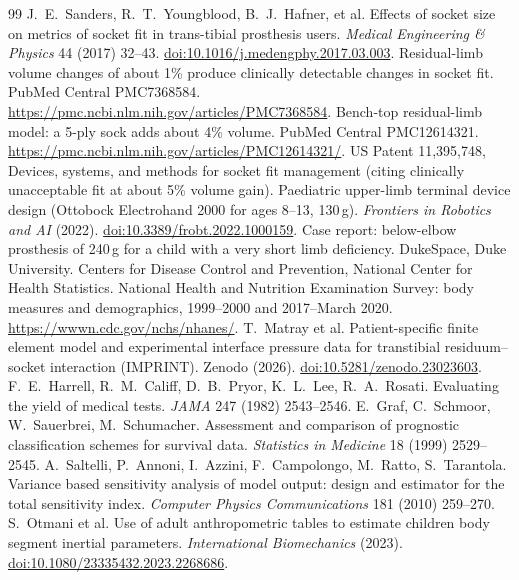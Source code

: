 \documentclass[11pt]{article}
\theoremstyle{definition}
\begin{document}
\begin{thebibliography}{99}
 J.~E.~Sanders, R.~T.~Youngblood, B.~J.~Hafner, et al. Effects of socket size on metrics of socket fit in trans-tibial prosthesis users. \emph{Medical Engineering \& Physics} 44 (2017) 32--43. \href{https://doi.org/10.1016/j.medengphy.2017.03.003}{doi:10.1016/j.medengphy.2017.03.003}.
 Residual-limb volume changes of about 1\% produce clinically detectable changes in socket fit. PubMed Central PMC7368584. \url{https://pmc.ncbi.nlm.nih.gov/articles/PMC7368584}.
 Bench-top residual-limb model: a 5-ply sock adds about 4\% volume. PubMed Central PMC12614321. \url{https://pmc.ncbi.nlm.nih.gov/articles/PMC12614321/}.
 US Patent 11,395,748, Devices, systems, and methods for socket fit management (citing clinically unacceptable fit at about 5\% volume gain).
 Paediatric upper-limb terminal device design (Ottobock Electrohand 2000 for ages 8--13, 130\,g). \emph{Frontiers in Robotics and AI} (2022). \href{https://doi.org/10.3389/frobt.2022.1000159}{doi:10.3389/frobt.2022.1000159}.
 Case report: below-elbow prosthesis of 240\,g for a child with a very short limb deficiency. DukeSpace, Duke University.
 Centers for Disease Control and Prevention, National Center for Health Statistics. National Health and Nutrition Examination Survey: body measures and demographics, 1999--2000 and 2017--March 2020. \url{https://wwwn.cdc.gov/nchs/nhanes/}.
 T.~Matray et al. Patient-specific finite element model and experimental interface pressure data for transtibial residuum--socket interaction (IMPRINT). Zenodo (2026). \href{https://doi.org/10.5281/zenodo.23023603}{doi:10.5281/zenodo.23023603}.
 F.~E.~Harrell, R.~M.~Califf, D.~B.~Pryor, K.~L.~Lee, R.~A.~Rosati. Evaluating the yield of medical tests. \emph{JAMA} 247 (1982) 2543--2546.
 E.~Graf, C.~Schmoor, W.~Sauerbrei, M.~Schumacher. Assessment and comparison of prognostic classification schemes for survival data. \emph{Statistics in Medicine} 18 (1999) 2529--2545.
 A.~Saltelli, P.~Annoni, I.~Azzini, F.~Campolongo, M.~Ratto, S.~Tarantola. Variance based sensitivity analysis of model output: design and estimator for the total sensitivity index. \emph{Computer Physics Communications} 181 (2010) 259--270.
 S.~Otmani et al. Use of adult anthropometric tables to estimate children body segment inertial parameters. \emph{International Biomechanics} (2023). \href{https://doi.org/10.1080/23335432.2023.2268686}{doi:10.1080/23335432.2023.2268686}.
\end{thebibliography}
\end{document}
